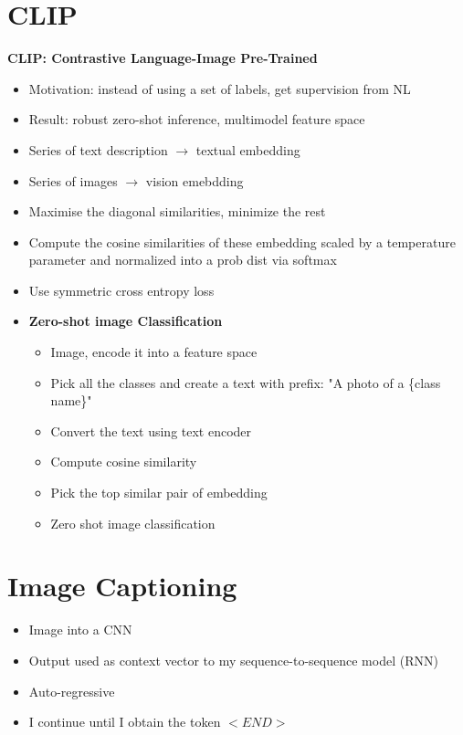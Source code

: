 \section{CLIP}
\textbf{CLIP: Contrastive Language-Image Pre-Trained}
\begin{itemize}
    \item Motivation: instead of using a set of labels, get supervision from NL
    \item Result: robust zero-shot inference, multimodel feature space
    \item Series of text description \(\rightarrow\) textual embedding
    \item Series of images \(\rightarrow\) vision emebdding
    \item Maximise the diagonal similarities, minimize the rest
    \item Compute the cosine similarities of these embedding scaled by a temperature parameter and normalized into a prob dist via softmax
    \item Use symmetric cross entropy loss
    \item \textbf{Zero-shot image Classification}
    \begin{itemize}
        \item Image, encode it into a feature space
        \item Pick all the classes and create a text with prefix: "A photo of a \{class name\}"
        \item Convert the text using text encoder
        \item Compute cosine similarity
        \item Pick the top similar pair of embedding
        \item Zero shot image classification
    \end{itemize}
\end{itemize}

\section{Image Captioning}
\begin{itemize}
    \item Image into a CNN
    \item Output used as context vector to my sequence-to-sequence model (RNN)
    \item Auto-regressive
    \item I continue until I obtain the token \(<END>\)
\end{itemize}


